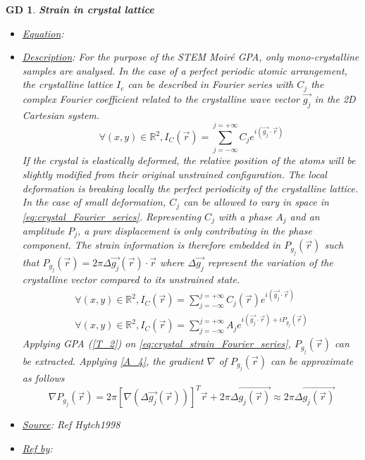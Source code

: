 \documentclass[12pt]{article}
\newtheorem{GD}{GD}
\begin{document}
\begin{GD}
\normalfont \textbf{Strain in crystal lattice}
\begin{itemize}
\item \underline{Equation}: 
\item \underline{Description}: For the purpose of the STEM Moir{\'e} GPA, only mono-crystalline samples are analysed. In the case of a perfect periodic atomic arrangement, the crystalline lattice $I_c$ can be described in Fourier series with $C_j$ the complex Fourier coefficient related to the crystalline wave vector $\vec{g_j}$ in the 2D Cartesian system.
\begin{equation}
\forall (x,y) \in \mathbb{R}^{2},I_C(\vec{r})=\sum_{j=-\infty}^{j=+\infty}C_je^{i(\vec{g_j}\cdot\vec{r})}
\label{eq:crystal_Fourier_series}
\end{equation}
If the crystal is elastically deformed, the relative position of the atoms will be slightly modified from their original unstrained configuration. The local deformation is breaking locally the perfect periodicity of the crystalline lattice. In the case of small deformation, $C_j$ can be allowed to vary in space in \cref{eq:crystal_Fourier_series}. Representing $C_j$ with a phase $A_j$ and an amplitude $P_j$, a pure displacement is only contributing in the phase component. The strain information is therefore embedded in $P_{g_{j}}(\vec{r})$ such that $P_{g_{j}}(\vec{r})=2\pi\Delta \overrightarrow{g_{j}}(\vec{r})\cdot\vec{r}$ where $\Delta \overrightarrow{g_j}$ represent the variation of the crystalline vector compared to its unstrained state.
\begin{equation}
\begin{gathered}
\forall (x,y) \in \mathbb{R}^{2},I_C(\vec{r})=\sum_{j=-\infty}^{j=+\infty}C_j(\vec{r})e^{i(\vec{g_j}\cdot\vec{r})} \\
\forall (x,y) \in \mathbb{R}^{2},I_C(\vec{r})=\sum_{j=-\infty}^{j=+\infty}A_je^{i(\vec{g_j}\cdot\vec{r})+iP_{g_{j}}(\vec{r})}
\end{gathered}
\label{eq:crystal_strain_Fourier_series}
\end{equation}
Applying GPA (\cref{T_2}) on \cref{eq:crystal_strain_Fourier_series}, $P_{g_{j}}(\vec{r})$ can be extracted. Applying \cref{A_4}, the gradient $\nabla$ of $P_{g_{j}}(\vec{r})$ can be approximate as follows
\begin{equation}
\nabla P_{g_{j}}(\vec{r}) = 2\pi [\nabla( \Delta \overrightarrow{g_j}(\vec{r}))]^T\vec{r}  + 2\pi\Delta \overrightarrow{g_j(\vec{r})} \approx 2\pi\Delta \overrightarrow{g_j(\vec{r})}
\label{eq:Strain_GPA}
\end{equation}
\item \underline{Source}: Ref Hytch1998
\item \underline{Ref by}:
\end{itemize}
\label{GD_1}
\end{GD}
\end{document}
